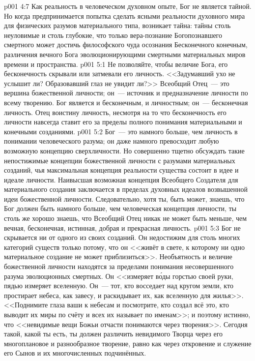 \vs p001 4:7 Как реальность в человеческом духовном опыте, Бог не является тайной. Но когда предпринимается попытка сделать ясными реальности духовного мира для физических разумов материального типа, возникает тайна: тайны столь неуловимые и столь глубокие, что только вера\hyp{}познание Богопознавшего смертного может достичь философского чуда осознания Бесконечного конечным, различения вечного Бога эволюционирующими смертными материальных миров времени и пространства.
\vs p001 5:1 Не позволяйте, чтобы величие Бога, его бесконечность скрывали или затмевали его личность. <<Задумавший ухо не услышит ли? Образовавший глаз не увидит ли?>> Всеобщий Отец~--- это вершина божественной личности; он~--- источник и предназначение личности по всему творению. Бог является и бесконечным, и личностным; он~--- бесконечная личность. Отец воистину личность, несмотря на то что бесконечность его личности навсегда ставит его за пределы полного понимания материальными и конечными созданиями.
\vs p001 5:2 Бог~--- это намного больше, чем личность в понимании человеческого разума; он даже намного превосходит любую возможную концепцию сверхличности. Но совершенно тщетно обсуждать такие непостижимые концепции божественной личности с разумами материальных созданий, чья максимальная концепция реальности существа состоит в идее и идеале личности. Наивысшая возможная концепция Всеобщего Создателя для материального создания заключается в пределах духовных идеалов возвышенной идеи божественной личности. Следовательно, хотя ты, быть может, знаешь, что Бог должен быть намного больше, чем человеческая концепция личности, ты столь же хорошо знаешь, что Всеобщий Отец никак не может быть меньше, чем вечная, бесконечная, истинная, добрая и прекрасная личность.
\vs p001 5:3 Бог не скрывается ни от одного из своих созданий. Он недостижим для столь многих категорий существ только потому, что он <<живёт в свете, к которому ни одно материальное создание не может приблизиться>>. Необъятность и величие божественной личности находятся за пределами понимания несовершенного разума эволюционных смертных. Он <<измеряет в\'оды горстью своей руки, пядью измеряет вселенную. Он~--- тот, кто восседает над кругом земли, кто простирает небеса, как завесу, и раскидывает их, как вселенную для жилья>>. <<Поднимите глаза ваши к небесам и посмотрите, кто создал всё это, кто выводит их миры по счёту и всех их называет по именам>>; и поэтому истинно, что <<невидимые вещи Божьи отчасти понимаются через творения>>. Сегодня такой, какой ты есть, ты должен различить невидимого Творца через его многоплановое и разнообразное творение, равно как через откровение и служение его Сынов и их многочисленных подчинённых.
